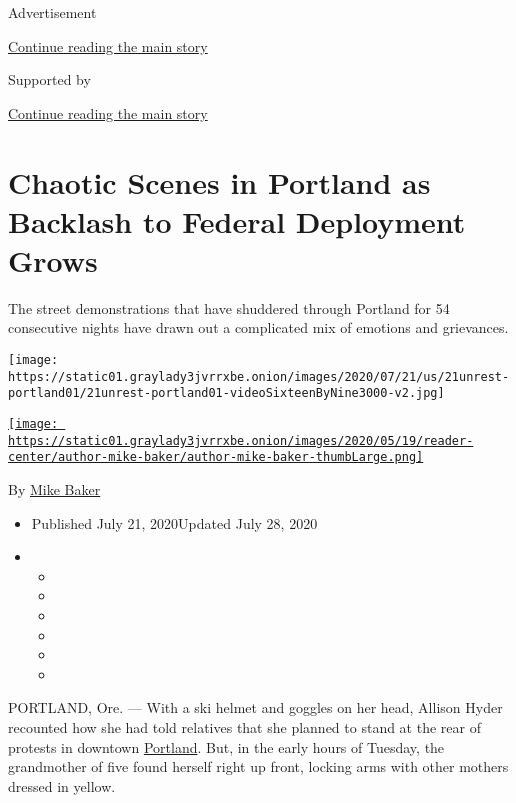 Advertisement

\protect\hyperlink{after-top}{Continue reading the main story}

Supported by

\protect\hyperlink{after-sponsor}{Continue reading the main story}

\hypertarget{chaotic-scenes-in-portland-as-backlash-to-federal-deployment-grows}{%
\section{Chaotic Scenes in Portland as Backlash to Federal Deployment
Grows}\label{chaotic-scenes-in-portland-as-backlash-to-federal-deployment-grows}}

The street demonstrations that have shuddered through Portland for 54
consecutive nights have drawn out a complicated mix of emotions and
grievances.

\texttt{[image: https://static01.graylady3jvrrxbe.onion/images/2020/07/21/us/21unrest-portland01/21unrest-portland01-videoSixteenByNine3000-v2.jpg]}

\href{https://www.nytimes3xbfgragh.onion/by/mike-baker}{\texttt{[image: https://static01.graylady3jvrrxbe.onion/images/2020/05/19/reader-center/author-mike-baker/author-mike-baker-thumbLarge.png]}}

By \href{https://www.nytimes3xbfgragh.onion/by/mike-baker}{Mike Baker}

\begin{itemize}
\item
  Published July 21, 2020Updated July 28, 2020
\item
  \begin{itemize}
  \item
  \item
  \item
  \item
  \item
  \item
  \end{itemize}
\end{itemize}

PORTLAND, Ore. --- With a ski helmet and goggles on her head, Allison
Hyder recounted how she had told relatives that she planned to stand at
the rear of protests in downtown
\href{https://www.nytimes3xbfgragh.onion/2020/07/28/us/portland-protests-fact-check.html}{Portland}.
But, in the early hours of Tuesday, the grandmother of five found
herself right up front, locking arms with other mothers dressed in
yellow.

